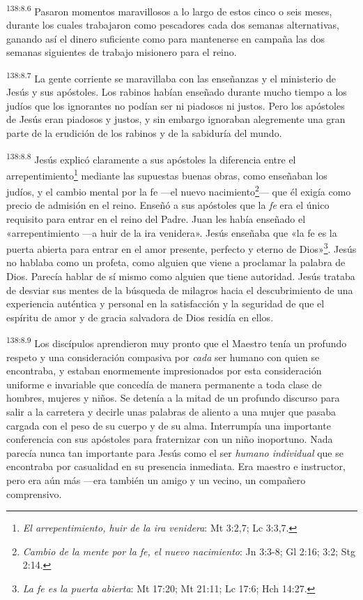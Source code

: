 \par
\textsuperscript{138:8.6} Pasaron momentos maravillosos a lo largo de estos cinco o seis meses, durante los cuales trabajaron como pescadores cada dos semanas alternativas, ganando así el dinero suficiente como para mantenerse en campaña las dos semanas siguientes de trabajo misionero para el reino.

\par
\textsuperscript{138:8.7} La gente corriente se maravillaba con las enseñanzas y el ministerio de Jesús y sus apóstoles. Los rabinos habían enseñado durante mucho tiempo a los judíos que los ignorantes no podían ser ni piadosos ni justos. Pero los apóstoles de Jesús eran piadosos y justos, y sin embargo ignoraban alegremente una gran parte de la erudición de los rabinos y de la sabiduría del mundo.

\par
\textsuperscript{138:8.8} Jesús explicó claramente a sus apóstoles la diferencia entre el arrepentimiento\footnote{\textit{El arrepentimiento, huir de la ira venidera}: Mt 3:2,7; Lc 3:3,7.} mediante las supuestas buenas obras, como enseñaban los judíos, y el cambio mental por la fe ---el nuevo nacimiento\footnote{\textit{Cambio de la mente por la fe, el nuevo nacimiento}: Jn 3:3-8; Gl 2:16; 3:2; Stg 2:14.}--- que él exigía como precio de admisión en el reino. Enseñó a sus apóstoles que la \textit{fe} era el único requisito para entrar en el reino del Padre. Juan les había enseñado el «arrepentimiento ---a huir de la ira venidera». Jesús enseñaba que «la fe es la puerta abierta para entrar en el amor presente, perfecto y eterno de Dios»\footnote{\textit{La fe es la puerta abierta}: Mt 17:20; Mt 21:11; Lc 17:6; Hch 14:27.}. Jesús no hablaba como un profeta, como alguien que viene a proclamar la palabra de Dios. Parecía hablar de sí mismo como alguien que tiene autoridad. Jesús trataba de desviar sus mentes de la búsqueda de milagros hacia el descubrimiento de una experiencia auténtica y personal en la satisfacción y la seguridad de que el espíritu de amor y de gracia salvadora de Dios residía en ellos.

\par
\textsuperscript{138:8.9} Los discípulos aprendieron muy pronto que el Maestro tenía un profundo respeto y una consideración compasiva por \textit{cada} ser humano con quien se encontraba, y estaban enormemente impresionados por esta consideración uniforme e invariable que concedía de manera permanente a toda clase de hombres, mujeres y niños. Se detenía a la mitad de un profundo discurso para salir a la carretera y decirle unas palabras de aliento a una mujer que pasaba cargada con el peso de su cuerpo y de su alma. Interrumpía una importante conferencia con sus apóstoles para fraternizar con un niño inoportuno. Nada parecía nunca tan importante para Jesús como el ser \textit{humano individual} que se encontraba por casualidad en su presencia inmediata. Era maestro e instructor, pero era aún más ---era también un amigo y un vecino, un compañero comprensivo.


